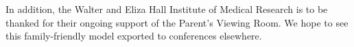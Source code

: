 \documentclass[twocolumn]{bmcart}%
\begin{document}

In addition, the Walter and Eliza Hall Institute of Medical Research is to be thanked for their ongoing support of the Parent's Viewing Room.  We hope to see this family-friendly model exported to conferences elsewhere.



\end{document}
